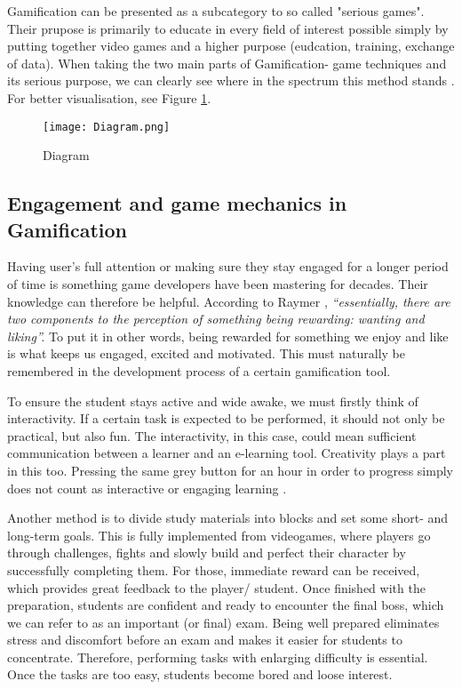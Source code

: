 \documentclass[10pt,english,a4paper]{article}
\begin{document}
	Gamification can be presented as a subcategory to so called "serious games". 
	Their prupose is primarily to educate in every field of interest possible simply by putting together video games and a higher purpose (eudcation, training, exchange of data). 
	When taking the two main parts of Gamification- game techniques and its serious purpose, we can clearly see where in the spectrum this method stands \cite{Laucelli}.
	For better visualisation, see Figure \ref{fig:diagram}.

	\begin{figure}[hp]
		\centering
		\texttt{[image: Diagram.png]}
		\caption{Diagram}
		\label{fig:diagram}
	\end{figure}

\subsection{Engagement and game mechanics in Gamification} \label{section3.1}
	Having user’s full attention or making sure they stay engaged for a longer period of time is something game developers have been mastering for decades. 
	Their knowledge can therefore be helpful. 
	According to Raymer \cite{Raymer}, \textit{“essentially, there are two components to the perception of something being rewarding: wanting and liking”.} 
	To put it in other words, being rewarded for something we enjoy and like is what keeps us engaged, excited and motivated. 
	This must naturally be remembered in the development process of a certain gamification tool.

	To ensure the student stays active and wide awake, we must firstly think of interactivity. 
	If a certain task is expected to be performed, it should not only be practical, but also fun. 
	The interactivity, in this case, could mean sufficient communication between a learner and an e-learning tool. 
	Creativity plays a part in this too. Pressing the same grey button for an hour in order to progress simply does not count as interactive or engaging learning \cite{ AL-Smadi}. 
	
	Another method is to divide study materials into blocks and set some short- and long-term goals. 
	This is fully implemented from videogames, where players go through challenges, fights and slowly build and perfect their character by successfully completing them.
	For those, immediate reward can be received, which provides great feedback to the player/ student.
	Once finished with the preparation, students are confident and ready to encounter the final boss, which we can refer to as an important (or final) exam. 
	Being well prepared eliminates stress and discomfort before an exam and makes it easier for students to concentrate.
	Therefore, performing tasks with enlarging difficulty is essential. Once the tasks are too easy, students become bored and loose interest. 
\end{document}
